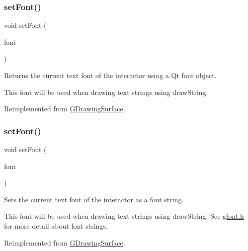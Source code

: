 \subsubsection{\texorpdfstring{set\+Font()}{setFont()}\hspace{0.1cm}{\footnotesize\ttfamily [1/2]}}
{\footnotesize\ttfamily void set\+Font (\begin{DoxyParamCaption}\item[{const Q\+Font \&}]{font }\end{DoxyParamCaption})\hspace{0.3cm}{\ttfamily [virtual]}}



Returns the current text font of the interactor using a Qt font object. 

This font will be used when drawing text strings using draw\+String. 

Reimplemented from \mbox{\hyperlink{classGDrawingSurface}{G\+Drawing\+Surface}}.

\mbox{\label{classGCanvas_ab39ef411fb13a52852ddd138c5932e2e}} 
\subsubsection{\texorpdfstring{set\+Font()}{setFont()}\hspace{0.1cm}{\footnotesize\ttfamily [2/2]}}
{\footnotesize\ttfamily void set\+Font (\begin{DoxyParamCaption}\item[{const std\+::string \&}]{font }\end{DoxyParamCaption})\hspace{0.3cm}{\ttfamily [virtual]}}



Sets the current text font of the interactor as a font string. 

This font will be used when drawing text strings using draw\+String. See \mbox{\hyperlink{gfont_8h_source}{gfont.\+h}} for more detail about font strings. 

Reimplemented from \mbox{\hyperlink{classGDrawingSurface_a8e096e8818d838aceae1d46d58fb3a7b}{G\+Drawing\+Surface}}.

\mbox{\label{classGCanvas_af9227e80cbfac55ce936fa5c99ffc954}} 
